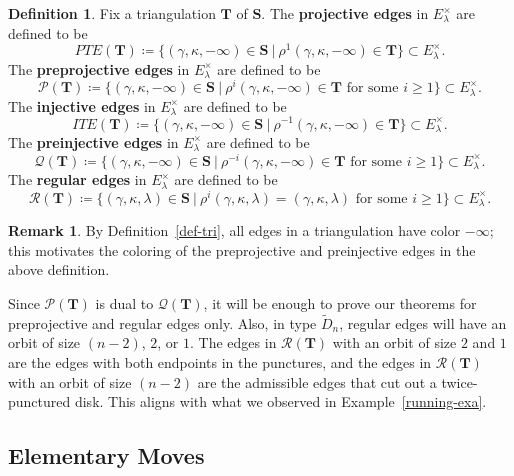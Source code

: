 \documentclass[11pt]{amsart}
\theoremstyle{plain}
\theoremstyle{definition}
\newtheorem{definition}[theorem]{Definition}
\newtheorem{remark}[theorem]{Remark}
\numberwithin{equation}{section}
\def\surf{\mathbf{S}}                       %
\def\TT{\mathbf{T}}
\begin{document}
\begin{definition}
    Fix a triangulation $\TT$ of $\surf$.
    The \textbf{projective edges} in $E^\times_\lambda$ are defined to be 
    $$PTE(\TT) \coloneqq \{ (\gamma, \kappa, -\infty) \in \surf \ | \ \rho^1(\gamma, \kappa, -\infty) \in \TT \} \subset E^\times_\lambda.$$
    The \textbf{preprojective edges} in $E^\times_\lambda$ are defined to be
    $$\mathcal{P}(\TT) \coloneqq \{ (\gamma, \kappa, -\infty) \in \surf \ | \ \rho^i(\gamma, \kappa, -\infty) \in \TT \text{ for some } i \geq 1 \} \subset E^\times_\lambda.$$
    The \textbf{injective edges} in $E^\times_\lambda$ are defined to be 
    $$ITE(\TT) \coloneqq \{ (\gamma, \kappa, -\infty) \in \surf \ | \ \rho^{-1}(\gamma, \kappa, -\infty) \in \TT \} \subset E^\times_\lambda.$$
    The \textbf{preinjective edges} in $E^\times_\lambda$ are defined to be
    $$\mathcal{Q}(\TT) \coloneqq \{ (\gamma, \kappa, -\infty) \in \surf \ | \ \rho^{-i}(\gamma, \kappa, -\infty) \in \TT \text{ for some } i \geq 1 \} \subset E^\times_\lambda.$$
    The \textbf{regular edges} in $E^\times_\lambda$ are defined to be
    $$\mathcal{R}(\TT) \coloneqq \{ (\gamma, \kappa, \lambda) \in \surf \ | \ \rho^{i}(\gamma, \kappa, \lambda) = (\gamma, \kappa, \lambda) \text{ for some } i \geq 1 \} \subset E^\times_\lambda.$$
\end{definition}

\begin{remark}
    By Definition~\ref{def-tri}, all edges in a triangulation have color $-\infty$; this motivates the coloring of the preprojective and preinjective edges in the above definition.
\end{remark}

Since $\mathcal{P}(\TT)$ is dual to $\mathcal{Q}(\TT)$, it will be enough to prove our theorems for preprojective and regular edges only.
Also, in type $\widetilde{D}_n$, regular edges will have an orbit of size $(n-2)$, $2$, or $1$.
The edges in $\mathcal{R}(\TT)$ with an orbit of size $2$ and $1$ are the edges with both endpoints in the punctures, and the edges in $\mathcal{R}(\TT)$ with an orbit of size $(n-2)$ are the admissible edges that cut out a twice-punctured disk.
This aligns with what we observed in Example~\ref{running-exa}.

\subsection{Elementary Moves}
\end{document}
